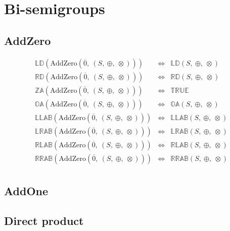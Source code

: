 \documentclass[10pt]{report}
\newcommand{\propname}[1]{{\mathbb{#1}}}
\begin{document}

\section{Bi-semigroups}

\subsection{AddZero} 

\[
\begin{array}{rcl} 
\propname{LD}(\mathrm{AddZero}(\overline{0},\ (S,\ \oplus,\ \otimes))) 
    & \Leftrightarrow %
    & \propname{LD}(S,\ \oplus,\ \otimes) \\
\propname{RD}(\mathrm{AddZero}(\overline{0},\ (S,\ \oplus,\ \otimes))) 
    & \Leftrightarrow %
    & \propname{RD}(S,\ \oplus,\ \otimes) \\
\propname{ZA}(\mathrm{AddZero}(\overline{0},\ (S,\ \oplus,\ \otimes))) 
    & \Leftrightarrow %
    & \propname{TRUE}\\ 
\propname{OA}(\mathrm{AddZero}(\overline{0},\ (S,\ \oplus,\ \otimes))) 
    & \Leftrightarrow %
    & \propname{OA}(S,\ \oplus,\ \otimes) \\
\propname{LLAB}(\mathrm{AddZero}(\overline{0},\ (S,\ \oplus,\ \otimes))) 
    & \Leftrightarrow %
    & \propname{LLAB}(S,\ \oplus,\ \otimes)\\
\propname{LRAB}(\mathrm{AddZero}(\overline{0},\ (S,\ \oplus,\ \otimes))) 
    & \Leftrightarrow %
    & \propname{LRAB}(S,\ \oplus,\ \otimes)\\ 
\propname{RLAB}(\mathrm{AddZero}(\overline{0},\ (S,\ \oplus,\ \otimes))) 
    & \Leftrightarrow %
    & \propname{RLAB}(S,\ \oplus,\ \otimes)\\ 
\propname{RRAB}(\mathrm{AddZero}(\overline{0},\ (S,\ \oplus,\ \otimes))) 
    & \Leftrightarrow %
    & \propname{RRAB}(S,\ \oplus,\ \otimes)\\ 

\end{array} 
\] 

\subsection{AddOne} 





\subsection{Direct product} 
\end{document}
